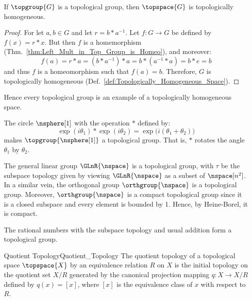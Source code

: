         \begin{theorem}
            \label{thm:Top_Groups_are_Homogeneous}%
            If $\topgroup{G}$ is a topological group, then $\topspace{G}$ is
            topologically homogeneous.
        \end{theorem}
        \begin{proof}
            For let $a,b\in{G}$ and let $r=b*a^{\minus{1}}$. Let
            $f:G\rightarrow{G}$ be defined by $f(x)=r*x$. But then $f$ is a
            homemorphism (Thm.~\ref{thm:Left_Mult_in_Top_Group_is_Homeo}), and
            moreover:
            \begin{equation}
                f(a)=r*a=(b*a^{\minus{1}})*a=b*(a^{\minus{1}}*a)=b*e=b
            \end{equation}
            and thus $f$ is a homeomorphism such that $f(a)=b$. Therefore, $G$
            is topologically homogeneous
            (Def.~\ref{def:Topologically_Homogeneous_Space}).
        \end{proof}
        Hence every topological group is an example of a topologically
        homogeneous space.
        \begin{example}
            The circle $\nsphere[1]$ with the operation $*$ defined by:
            \begin{equation}
                \exp(i\theta_{1})*\exp(i\theta_{2})=
                \exp\big(i(\theta_{1}+\theta_{2})\big)
            \end{equation}
            makes $\topgroup{\nsphere[1]}$ a topological group. That is,
            $*$ rotates the angle $\theta_{1}$ by $\theta_{2}$.
        \end{example}
        \begin{example}
            The general linear group $\GLnR{\nspace}$ is a topological group,
            with $\tau$ be the subspace topology given by viewing
            $\GLnR{\nspace}$ as a subset of $\nspace[n^{2}]$. In a similar vein,
            the orthogonal group $\orthgroup{\nspace}$ is a topological group.
            Moreover, $\orthgroup{\nspace}$ is a compact topological group since
            it is a closed subspace and every element is bounded by 1. Hence,
            by Heine-Borel, it is compact.
        \end{example}
        \begin{example}
            The rational numbers with the subspace topology and usual addition
            form a topological group.
        \end{example}
        \begin{fdefinition}{Quotient Topology}{Quotient_Topology}
            The quotient topology of a topological space $\topspace{X}$ by an
            equivalence relation $R$ on $X$ is the initial topology on the
            quotient set $X/R$ generated by the canonical projection mapping
            $q:X\rightarrow{X}/R$ defined by $q(x)=[x]$, where $[x]$ is the
            equivalence class of $x$ with respect to $R$.
        \end{fdefinition}
